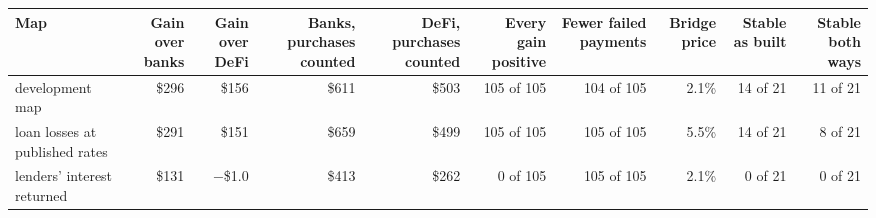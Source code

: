 \begin{tabular}{lrrrrrrrrr}
\toprule
Map & Gain over banks & Gain over DeFi & Banks, purchases counted & DeFi, purchases counted & Every gain positive & Fewer failed payments & Bridge price & Stable as built & Stable both ways \\
\midrule
development map & \$296 & \$156 & \$611 & \$503 & 105 of 105 & 104 of 105 & 2.1\% & 14 of 21 & 11 of 21 \\
\midrule
loan losses at published rates & \$291 & \$151 & \$659 & \$499 & 105 of 105 & 105 of 105 & 5.5\% & 14 of 21 & 8 of 21 \\
lenders' interest returned & \$131 & $-$\$1.0 & \$413 & \$262 & 0 of 105 & 105 of 105 & 2.1\% & 0 of 21 & 0 of 21 \\
\bottomrule
\end{tabular}

